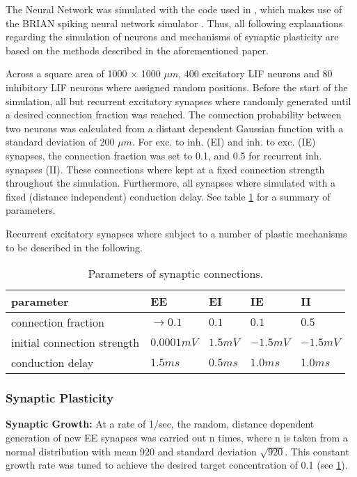 \documentclass[10pt,a4paper]{article}
\begin{document}
The Neural Network was simulated with the code used in \cite{SORN_Paper}, which makes use of the BRIAN spiking neural network simulator \cite{Briansim}. Thus, all following explanations regarding the simulation of neurons and mechanisms of synaptic plasticity are based on the methods described in the aforementioned paper.

Across a square area of 1000 $\times$ 1000 $\mu m$, 400 excitatory LIF neurons and 80 inhibitory LIF neurons where assigned random positions. Before the start of the simulation, all but recurrent excitatory synapses where randomly generated until a desired connection fraction was reached. The connection probability between two neurons was calculated from a distant dependent Gaussian function with a standard deviation of 200 $\mu m$. For exc. to inh. (EI) and inh. to exc. (IE) synapses, the connection fraction was set to 0.1, and 0.5 for recurrent inh. synapses (II). These connections where kept at a fixed connection strength throughout the simulation. Furthermore, all synapses where simulated with a fixed (distance independent) conduction delay. See table \ref{syn_conn_params} for a summary of parameters.

Recurrent excitatory synapses where subject to a number of plastic mechanisms to be described in the following. 

\begin{table}
\begin{tabular}{|l|l|l|l|l|}
\hline
\textbf{parameter} & \textbf{EE} & \textbf{EI} & \textbf{IE} & \textbf{II} \\ \hline
connection fraction & $\rightarrow 0.1$ & $0.1$ & $0.1$ & $0.5$ \\ \hline
initial connection strength & $0.0001 mV$ & $1.5 mV$ & $-1.5 mV$ & $-1.5 mV$ \\ \hline
conduction delay & $1.5 ms$ & $0.5 ms$ & $1.0 ms$ & $1.0 ms$ \\
\hline
\end{tabular}
\caption{Parameters of synaptic connections.}
\label{syn_conn_params}
\end{table}

\subsubsection{Synaptic Plasticity}

\textbf{Synaptic Growth:} At a rate of 1/sec, the random, distance dependent generation of new EE synapses was carried out n times, where n is taken from a normal distribution with mean 920 and standard deviation $\sqrt{920}$. This constant growth rate was tuned to achieve the desired target concentration of 0.1 (see \ref{syn_conn_params}).
\end{document}
